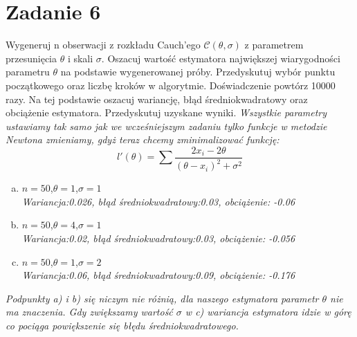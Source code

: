 \documentclass{memoir}
\begin{document}
\section*{Zadanie 6}
Wygeneruj n obserwacji z rozkładu Cauch'ego $\mathcal{C}(\theta,\sigma)$ z parametrem przesunięcia $\theta$ i skali $\sigma$. Oszacuj wartość estymatora największej wiarygodności parametru $\theta$ na podstawie wygenerowanej próby. Przedyskutuj wybór punktu początkowego oraz liczbę kroków w algorytmie. Doświadczenie powtórz 10000 razy. Na tej podstawie oszacuj wariancję, błąd średniokwadratowy oraz obciążenie estymatora. Przedyskutuj uzyskane wyniki. \textit{Wszystkie parametry ustawiamy tak samo jak we wcześniejszym zadaniu tylko funkcje w metodzie Newtona zmieniamy, gdyż teraz chcemy zminimalizować funkcję:} $$ l'(\theta)= \sum \frac{2x_i - 2\theta}{(\theta-x_i)^2+\sigma^2}$$
\begin{enumerate}[a)]
\item $n=50$,$\theta=1$,$\sigma=1$\\
\textit{Wariancja:0.026, błąd średniokwadratowy:0.03, obciążenie: -0.06}
\item $n=50$,$\theta=4$,$\sigma=1$\\
\textit{Wariancja:0.02, błąd średniokwadratowy:0.03, obciążenie: -0.056}
\item $n=50$,$\theta=1$,$\sigma=2$\\
\textit{Wariancja:0.06, błąd średniokwadratowy:0.09, obciążenie: -0.176}
\end{enumerate}
\textit{ Podpunkty a) i b) się niczym nie różnią, dla naszego estymatora parametr $\theta$ nie ma znaczenia. Gdy zwiększamy wartość $\sigma$ w c) wariancja estymatora idzie w górę co pociąga powiększenie się błędu średniokwadratowego.}
\end{document}
